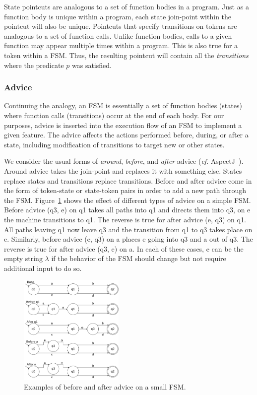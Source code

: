 \documentclass[conference]{IEEEtran}
\begin{document}
State pointcuts are analogous to a set of function bodies in a program. Just as a function body is unique within a program, each state join-point within the pointcut will also be unique.  Pointcuts that specify transitions on tokens are analogous to a set of function calls. Unlike function bodies, calls to a given function may appear multiple times within a program. This is also true for a token within a FSM. Thus, the resulting pointcut will contain all the \emph{transitions} where the predicate $p$ was satisfied. 

\subsubsection{Advice}
Continuing the analogy, an FSM is essentially a set of function bodies (states) where function calls (transitions) occur at the end of each body. For our purposes, advice is inserted into the execution flow of an FSM to implement a given feature. The advice affects the actions performed before, during, or after a state, including modification of transitions to target new or other states.

We consider the usual forms of \emph{around}, \emph{before}, and \emph{after} advice (\emph{cf}. AspectJ~\cite{AspectJ:01}). Around advice takes the join-point and replaces it with something else. States replace states and transitions replace transitions. Before and after advice come in the form of token-state or state-token pairs in order to add a new path through the FSM. Figure~\ref{fig:adviceExamples} shows the effect of different types of advice on a simple FSM. Before advice (q3, e) on q1 takes all paths into q1 and directs them into q3, on e the machine transitions to q1. The reverse is true for after advice (e, q3) on q1. All paths leaving q1 now leave q3 and the transition from q1 to q3 takes place on e. Similarly, before advice (e, q3) on a places e going into q3 and a out of q3. The reverse is true for after advice (q3, e) on a.  In each of these cases, e can be the empty string $\lambda$ if the behavior of the FSM should change but not require additional input to do so.

\begin{figure}[ht]
    \centering
    \includegraphics[width=0.45\textwidth]{isca2023-latex-template/figures/AdviceExamples.drawio.pdf}
    \caption{Examples of before and after advice on a small FSM.}
    \label{fig:adviceExamples}
\end{figure}
\end{document}

